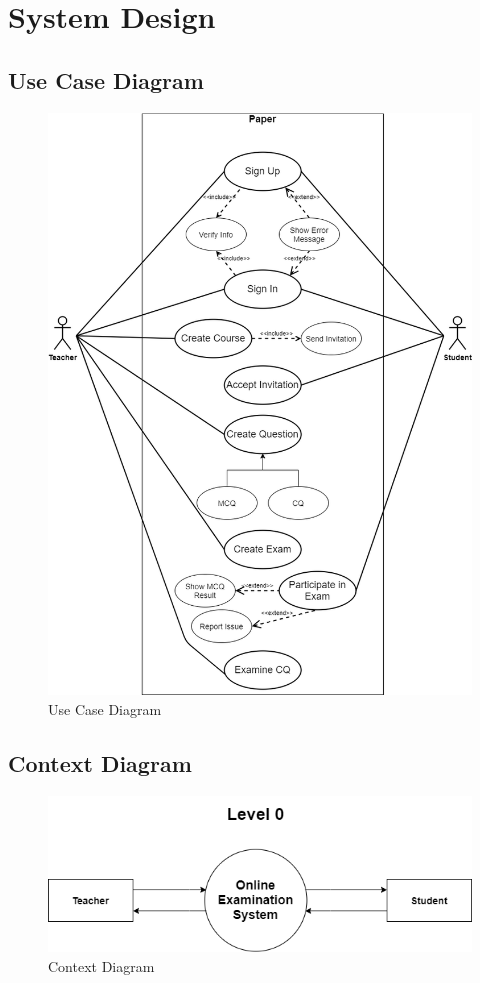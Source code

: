\documentclass[10pt]{article}
\begin{document}
\section{System Design}

\subsection{Use Case Diagram}

\begin{figure}[H]
  \centering
  \centerline{\includegraphics[width=\textwidth]{diagram/level1.png}}
  \caption{Use Case Diagram}
  \label{fig}
\end{figure}

\subsection{Context Diagram}
\begin{figure}[H]
  \centering
  \centerline{\includegraphics[width=\textwidth]{diagram/level0.png}}
  \caption{Context Diagram}
  \label{fig}
\end{figure}
\end{document}
